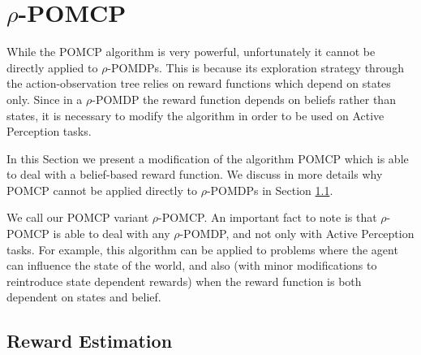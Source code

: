 \section{$\rho$-POMCP}

While the POMCP algorithm is very powerful, unfortunately it cannot be directly applied to
$\rho$-POMDPs. This is because its exploration strategy through the action-observation tree relies
on reward functions which depend on states only. Since in a $\rho$-POMDP the reward function depends
on beliefs rather than states, it is necessary to modify the algorithm in order to be used on Active
Perception tasks.

In this Section we present a modification of the algorithm POMCP which is able to deal with a
belief-based reward function. We discuss in more details why POMCP cannot be applied directly to
$\rho$-POMDPs in Section \ref{ref:rewestimation}.

We call our POMCP variant $\rho$-POMCP. An important fact to note is that $\rho$-POMCP is able to deal
with any $\rho$-POMDP, and not only with Active Perception tasks. For example, this algorithm can be
applied to problems where the agent can influence the state of the world, and also (with minor
modifications to reintroduce state dependent rewards) when the reward function is both dependent on
states and belief.

%
%
%

\subsection{Reward Estimation}\label{ref:rewestimation}


